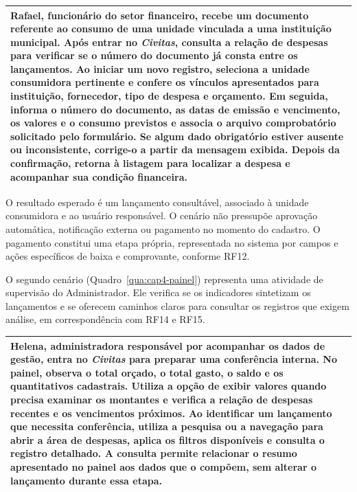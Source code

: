 \begin{quadro}[H]
\caption{Cenário -- Registro de despesa municipal}\label{qua:cap4-despesa}
\begin{tabularx}{\textwidth}{@{}X@{}}
\toprule
Rafael, funcionário do setor financeiro, recebe um documento referente ao consumo de uma unidade vinculada a uma instituição municipal. Após entrar no \textit{Civitas}, consulta a relação de despesas para verificar se o número do documento já consta entre os lançamentos. Ao iniciar um novo registro, seleciona a unidade consumidora pertinente e confere os vínculos apresentados para instituição, fornecedor, tipo de despesa e orçamento. Em seguida, informa o número do documento, as datas de emissão e vencimento, os valores e o consumo previstos e associa o arquivo comprobatório solicitado pelo formulário. Se algum dado obrigatório estiver ausente ou inconsistente, corrige-o a partir da mensagem exibida. Depois da confirmação, retorna à listagem para localizar a despesa e acompanhar sua condição financeira.\\
\bottomrule
\end{tabularx}
\end{quadro}

O resultado esperado é um lançamento consultável, associado à unidade consumidora e ao usuário responsável. O cenário não pressupõe aprovação automática, notificação externa ou pagamento no momento do cadastro. O pagamento constitui uma etapa própria, representada no sistema por campos e ações específicos de baixa e comprovante, conforme RF12.

O segundo cenário (Quadro~\ref{qua:cap4-painel}) representa uma atividade de supervisão do Administrador. Ele verifica se os indicadores sintetizam os lançamentos e se oferecem caminhos claros para consultar os registros que exigem análise, em correspondência com RF14 e RF15.

\begin{quadro}[H]
\caption{Cenário -- Acompanhamento financeiro no painel}\label{qua:cap4-painel}
\begin{tabularx}{\textwidth}{@{}X@{}}
\toprule
Helena, administradora responsável por acompanhar os dados de gestão, entra no \textit{Civitas} para preparar uma conferência interna. No painel, observa o total orçado, o total gasto, o saldo e os quantitativos cadastrais. Utiliza a opção de exibir valores quando precisa examinar os montantes e verifica a relação de despesas recentes e os vencimentos próximos. Ao identificar um lançamento que necessita conferência, utiliza a pesquisa ou a navegação para abrir a área de despesas, aplica os filtros disponíveis e consulta o registro detalhado. A consulta permite relacionar o resumo apresentado no painel aos dados que o compõem, sem alterar o lançamento durante essa etapa.\\
\bottomrule
\end{tabularx}
\end{quadro}

